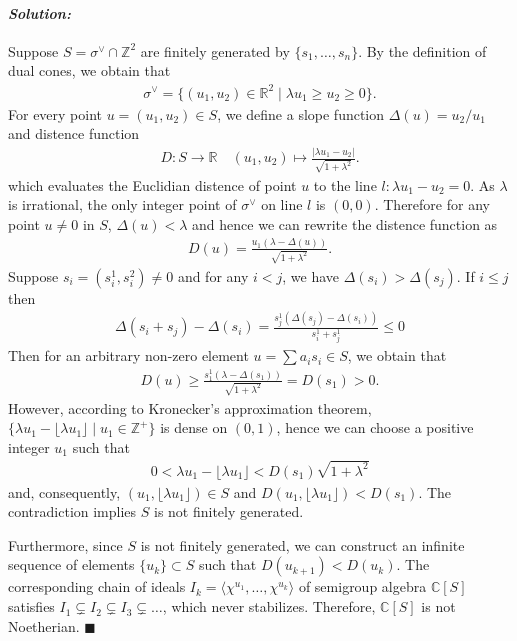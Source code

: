 \documentclass[12pt, a4paper]{article}
\newenvironment{solution}
  {\paragraph{\textit{Solution:}}\par\medskip}
  {\hfill$\blacksquare$\vspace{0.1cm}}
\begin{document}
\begin{solution}
Suppose $S = \sigma^{\vee}\cap \mathbb{Z}^2$ are finitely generated by $\{s_1,\dots,s_n\}$. By the definition of dual cones, we obtain that
\begin{align*}
    \sigma^\vee = \{(u_1,u_2)\in \mathbb{R}^2\mid  \lambda u_1\ge u_2\ge 0 \}.
\end{align*} 
For every point $u=(u_1,u_2)\in S$, we define a slope function $\Delta(u) = u_2/u_1$ and distence function
\begin{align*}
    D:S\to \mathbb{R}\quad 
    (u_1,u_2) \mapsto \frac{|\lambda u_1-u_2|}{\sqrt{1+\lambda^2}}.
\end{align*}
which evaluates the Euclidian distence of point $u$ to the line $l:\lambda u_1-u_2=0$. As $\lambda$ is irrational, the only integer point of $\sigma^\vee$ on line $l$ is $(0,0)$. Therefore for any point $u\neq 0$ in $S$, $\Delta(u)<\lambda$ and 
hence we can rewrite the distence function as
\begin{align*}
    D(u) = \frac{u_1(\lambda-\Delta(u))}{\sqrt{1+\lambda^2}}.
\end{align*}
Suppose $s_i = (s_i^1,s_i^2)\neq 0$ and for any $i<j$, we have $\Delta(s_i)>\Delta(s_j)$.  
If $i\le j$ then
\begin{align*}
    \Delta(s_i+s_j)-\Delta(s_i) = \frac{s_j^{1}(\Delta(s_j)-\Delta(s_i))}{s_i^{1}+s_j^1}\le 0
\end{align*} 
Then for an arbitrary non-zero element $u=\sum a_is_i\in S$, we obtain that
\begin{align*}
    D(u)\ge \frac{s^1_1(\lambda-\Delta(s_1))}{\sqrt{1+\lambda^2}} = D(s_1)>0.
\end{align*}
However, according to Kronecker's approximation theorem, $\{ \lambda u_1 - \lfloor \lambda u_1 \rfloor \mid u_1 \in \mathbb{Z}^+ \}$ is dense on 
$(0,1)$, hence we can choose a positive integer $u_1$ such that 
\begin{align*}
    0<\lambda u_1-\lfloor \lambda u_1 \rfloor<D(s_1)\sqrt{1+\lambda^2}
\end{align*}
and, consequently, $(u_1,\lfloor \lambda u_1 \rfloor)\in S$ and $D(u_1,\lfloor \lambda u_1 \rfloor)<D(s_1)$. The contradiction implies $S$ is not finitely generated.

Furthermore, since $S$ is not finitely generated, we can construct an infinite sequence of elements $\{{u_k}\} \subset S$ 
such that $D(u_{k+1}) < D(u_k)$. The corresponding chain of ideals $I_k = \langle \chi^{u_1}, \dots, \chi^{u_k} \rangle$ of semigroup 
algebra $\mathbb{C}[S]$ satisfies $I_1 \subsetneq I_2 \subsetneq I_3 \subsetneq \dots$, which never stabilizes. 
Therefore, $\mathbb{C}[S]$ is not Noetherian.
\end{solution}
\end{document}
